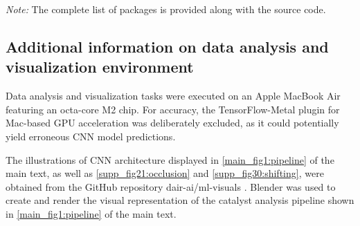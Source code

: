 \begin{table}[htbp]
  \smallskip

  \begin{flushright}
  \begin{minipage}{\textwidth}
    \footnotesize\textit{Note:} The complete list of packages is
      provided along with the source code.
  \end{minipage}
  \end{flushright}
\end{table}

\subsection{Additional information on data analysis and visualization environment}
\label{supp_sec4.2_vis_env}

Data analysis and visualization tasks were executed on an Apple MacBook Air featuring an octa-core M2 chip.
For accuracy, the TensorFlow-Metal plugin for Mac-based GPU acceleration was deliberately excluded,
as it could potentially yield erroneous CNN model predictions.

The illustrations of CNN architecture displayed in \cref{main_fig1:pipeline} of the main text,
as well as \cref{supp_fig21:occlusion} and \cref{supp_fig30:shifting},
were obtained from the GitHub repository dair-ai/ml-visuals \cite{Saravia_ML_Visuals_2021}.
Blender was used to create and render the visual representation of the
catalyst analysis pipeline shown in \cref{main_fig1:pipeline} of the main text.

